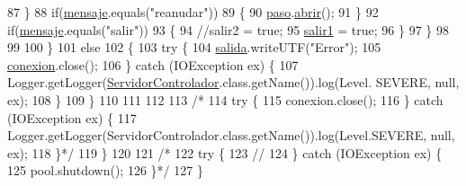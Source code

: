 \begin{DoxyCode}
87                     \}
88                     \textcolor{keywordflow}{if}(\mbox{\hyperlink{classpecl6part2_1_1_servidor_controlador_ac8db190b3104ab20a03976a5411f3bd6}{mensaje}}.equals(\textcolor{stringliteral}{"reanudar"}))
89                     \{
90                         \mbox{\hyperlink{classpecl6part2_1_1_servidor_controlador_a3d1fc8f640e9e8271b06bf8ae9ea1176}{paso}}.\mbox{\hyperlink{classpecl6part2_1_1_paso_a88a25090462335e5c21d6bbdd68f5a5e}{abrir}}();
91                     \}
92                     \textcolor{keywordflow}{if}(\mbox{\hyperlink{classpecl6part2_1_1_servidor_controlador_ac8db190b3104ab20a03976a5411f3bd6}{mensaje}}.equals(\textcolor{stringliteral}{"salir"}))
93                     \{
94                         \textcolor{comment}{//salir2 = true;}
95                         \mbox{\hyperlink{classpecl6part2_1_1_servidor_controlador_a1721c97ac463f940af370521ac8f78db}{salir1}} = \textcolor{keyword}{true};
96                     \}
97                 \}
98                 
99                 
100             \}
101             \textcolor{keywordflow}{else}
102             \{
103                 \textcolor{keywordflow}{try} \{
104                     \mbox{\hyperlink{classpecl6part2_1_1_servidor_controlador_a1a4f0c67b54fa5aa781c1ceafb347e47}{salida}}.writeUTF(\textcolor{stringliteral}{"Error"});
105                     \mbox{\hyperlink{classpecl6part2_1_1_servidor_controlador_a5a4f104c0585b0e66492f05ef7e32510}{conexion}}.close();
106                 \} \textcolor{keywordflow}{catch} (IOException ex) \{
107                     Logger.getLogger(\mbox{\hyperlink{classpecl6part2_1_1_servidor_controlador_a6f49d3d66d33c0f6dc5e7dab2af6766b}{ServidorControlador}}.class.getName()).log(Level.
      SEVERE, null, ex);
108                 \}
109             \}
110             
111             
112             
113             \textcolor{comment}{/*}
114 \textcolor{comment}{            try \{}
115 \textcolor{comment}{                conexion.close();}
116 \textcolor{comment}{            \} catch (IOException ex) \{}
117 \textcolor{comment}{                Logger.getLogger(ServidorControlador.class.getName()).log(Level.SEVERE, null, ex);}
118 \textcolor{comment}{            \}*/}
119         \}
120         
121         \textcolor{comment}{/*}
122 \textcolor{comment}{      try \{}
123 \textcolor{comment}{          //}
124 \textcolor{comment}{      \} catch (IOException ex) \{}
125 \textcolor{comment}{        pool.shutdown();}
126 \textcolor{comment}{      \}*/}
127          \}
\end{DoxyCode}


